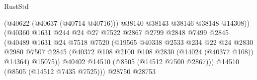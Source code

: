 \begin{lexlean}{RustStd}
\begin{coremodule}
                                                (@40622 (@40637 (@40714 @40716)))
                                                @38140
                                                @38143
                                                @38146
                                                @38148
                                                @14308))
                                            (@40360
                                              @1631
                                              @244
                                              @24
                                              @27
                                              @7522
                                              @2867
                                              @2799
                                              @2848
                                              @7499
                                              @2845
                                              (@40489
                                                @1631
                                                @24
                                                @7518
                                                @7520
                                                (@19565
                                                  @40338
                                                  @2533
                                                  @234
                                                  @22
                                                  @24
                                                  @2830
                                                  @2980
                                                  @7507
                                                  @2845
                                                  (@40372
                                                    @108
                                                    @2100
                                                    @108
                                                    @2830
                                                    (@14024 (@40377 @108))
                                                    @14364)
                                                  @15075))
                                              @40402
                                              @14510
                                              (@8505 (@14512 @7500 @2867)))
                                            @14510
                                            (@8505 (@14512 @7435 @7525)))
                                          @28750
                                          @28753

\end{coremodule}
\end{lexlean}
